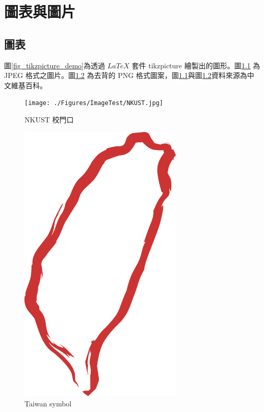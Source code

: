 \chapter{圖表與圖片}\label{Experimental_picture}


\section{圖表}

圖\ref{fig_tikzpicture_demo}為透過 $LaTeX$ 套件 tikzpicture 繪製出的圖形。圖\ref{fig_nkust} 為 JPEG 格式之圖片。圖\ref{fig_taiwan_symbol} 為去背的 PNG 格式圖案，圖\ref{fig_nkust}\cite{nkust_jpg}與圖\ref{fig_taiwan_symbol}\cite{taiwan_symbol}資料來源為中文維基百科。



\begin{figure}[H] 
    \centering 
    \texttt{[image: ./Figures/ImageTest/NKUST.jpg]} 
    \caption{NKUST 校門口}
    \label{fig_nkust}
\end{figure}

\begin{figure}[H] 
    \centering 
    \includegraphics[width=0.7\textwidth]{./Figures/ImageTest/Taiwan_symbol.png} 
    \caption{Taiwan symbol}
    \label{fig_taiwan_symbol}
\end{figure}

